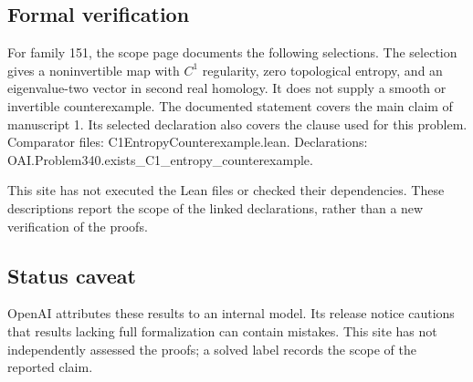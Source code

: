 \documentclass[11pt]{article}
\begin{document}
\subsection{Formal verification}
For family 151, the scope page documents the following selections. The selection gives a noninvertible map with $C^1$ regularity, zero topological entropy, and an eigenvalue-two vector in second real homology. It does not supply a smooth or invertible counterexample. The documented statement covers the main claim of manuscript 1. Its selected declaration also covers the clause used for this problem. Comparator files: C1EntropyCounterexample.lean. Declarations: OAI.Problem340.exists\_C1\_entropy\_counterexample.

This site has not executed the Lean files or checked their dependencies. These descriptions report the scope of the linked declarations, rather than a new verification of the proofs.

\subsection{Status caveat}
OpenAI attributes these results to an internal model. Its release notice cautions that results lacking full formalization can contain mistakes. This site has not independently assessed the proofs; a solved label records the scope of the reported claim.
\end{document}
